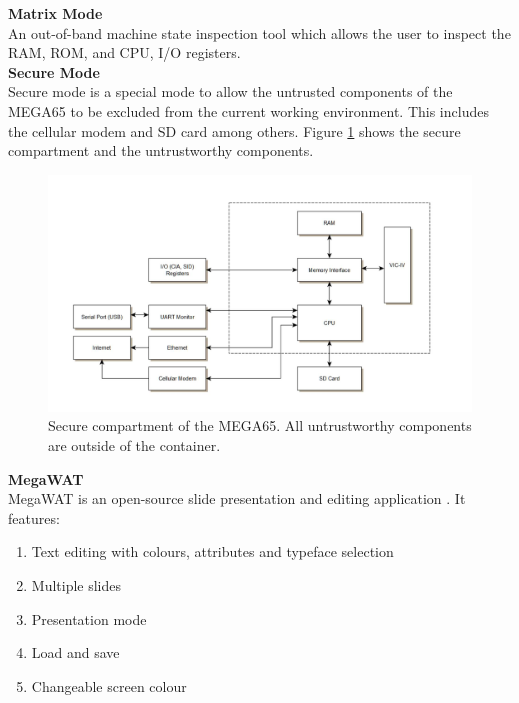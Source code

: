 \textbf{Matrix Mode}\\
An out-of-band machine state inspection tool which allows the user to inspect the RAM, ROM, and CPU, I/O registers.\\

\textbf{Secure Mode}\\
Secure mode is a special mode to allow the untrusted components of the MEGA65 to be excluded from the current working environment. This includes the cellular modem and SD card among others. Figure \ref{secure_compartment} shows the secure compartment and the untrustworthy components.\\

\begin{figure} \begin{center}
\includegraphics[width=.5\linewidth]{pics/secure_compartment} 
\end{center} 
\caption{Secure compartment of the MEGA65. All untrustworthy components are outside of the container.\\}
\label{secure_compartment}
\end{figure}


\textbf{MegaWAT} \\
MegaWAT is an open-source slide presentation and editing application \cite{RN163}. It features:
\begin{enumerate}
\item Text editing with colours, attributes and typeface selection
\item Multiple slides
\item Presentation mode
\item Load and save
\item Changeable screen colour
\end{enumerate}

